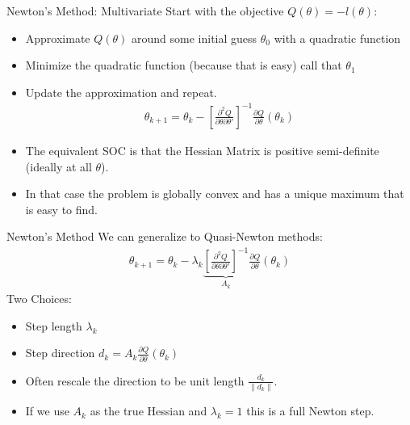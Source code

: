 \documentclass[xcolor=pdftex,dvipsnames,table,mathserif,aspectratio=169]{beamer}
\newcommand{\norm}[1]{\left\lVert#1\right\rVert}
\begin{document}
\begin{frame}{Newton's Method: Multivariate}
Start with the objective $Q(\theta) = - l(\theta)$:
\begin{itemize}
\item Approximate $Q(\theta)$ around some initial guess $\theta_0$ with a quadratic function
\item Minimize the quadratic function (because that is easy) call that $\theta_1$
\item Update the approximation and repeat.
\begin{align*}
\theta_{k+1} = \theta_k - \left[ \frac{\partial^2 Q}{\partial \theta \partial \theta'} \right]^{-1}\frac{\partial Q}{\partial \theta}(\theta_k)
\end{align*}
\item The equivalent SOC is that the {Hessian Matrix} is \alert{positive semi-definite}  (ideally at all $\theta$).
\item In that case the problem is \alert{globally convex} and has a \alert{unique maximum} that is easy to find.
\end{itemize}
\end{frame}


\begin{frame}{Newton's Method}
We can generalize to Quasi-Newton methods:
\begin{align*}
\theta_{k+1} = \theta_k -  \lambda_k \underbrace{\left[ \frac{\partial^2 Q}{\partial \theta \partial \theta'} \right]^{-1}}_{A_k} \frac{\partial Q}{\partial \theta}(\theta_k)
\end{align*}
Two Choices:
\begin{itemize}
\item Step length $\lambda_k$
\item Step direction $d_k=A_k \frac{\partial Q}{\partial \theta}(\theta_k)$
\item Often rescale the direction to be unit length $\frac{d_k}{\norm{d_k}}$.
\item If we use $A_k$ as the true Hessian and $\lambda_k=1$ this is a \alert{full Newton step}.
\end{itemize}
\end{frame}
\end{document}
